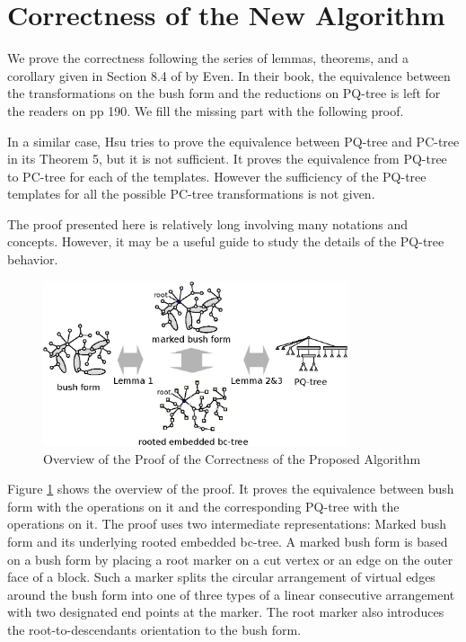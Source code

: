 \documentclass[a4]{jgaa-art}
\begin{document}
\section{Correctness of the New Algorithm}\label{se:correctness}

We prove the correctness following the series of lemmas, theorems, and a corollary given in
Section 8.4 of \cite{EVEN79} by Even.
In their book, the equivalence between the transformations on the bush form 
and the reductions on PQ-tree is left for the readers on pp 190.
We fill the missing part with the following proof.

In a similar case, Hsu \cite{HSU01} tries to prove the equivalence between 
PQ-tree and PC-tree in its Theorem 5, but it is not sufficient. 
It proves the equivalence from PQ-tree to PC-tree for each of the templates.
However the sufficiency of the PQ-tree templates for all the possible
PC-tree transformations is not given.

The proof presented here is relatively long involving many notations and concepts.
However, it may be a useful guide to study the details of the PQ-tree behavior.

\begin{figure}[!htb]
  \centering
  \includegraphics[width=0.8\textwidth]{proof_overview}
  \caption{Overview of the Proof of the Correctness of the Proposed Algorithm}
  \label{fig:proof_overview}
\end{figure}

Figure \ref{fig:proof_overview} shows the overview of the proof.
It proves the equivalence between bush form with the operations on it and the 
corresponding PQ-tree with the operations on it.
The proof uses two intermediate representations: Marked bush form and its underlying rooted embedded bc-tree.
A marked bush form is based on a bush form by placing a root marker on a cut vertex or an edge on the outer
face of a block.
Such a marker splits the circular arrangement of virtual edges around the bush form into one of three types of 
a linear consecutive arrangement with two designated end points at the marker.
The root marker also introduces the root-to-descendants orientation to the bush form.
\end{document}
